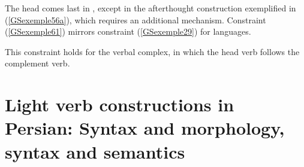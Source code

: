 %
%


The head comes last in , except in the afterthought construction exemplified in (\ref{GSexemple56a}), which requires an additional mechanism. Constraint (\ref{GSexemple61}) mirrors constraint (\ref{GSexemple29}) for  languages.
\ea
\label{GSexemple61}
 
\z

\noindent
This constraint holds for the verbal complex, in which the head verb follows the complement verb.



\section{Light verb constructions in Persian: Syntax and morphology, syntax and
  semantics}\label{GSsection5}
\label{sec-light-verbs-Persian}

